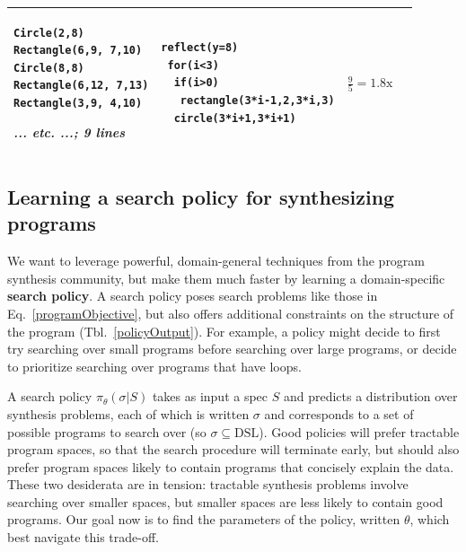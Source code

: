 \documentclass{article}
\theoremstyle{definition}
\begin{document}
\begin{table}[t]
\begin{tabular}{m{1.5cm}llc}
\begin{minipage}{\exampleTraceSize}\begin{lstlisting}
Circle(2,8)
Rectangle(6,9, 7,10)
Circle(8,8)
Rectangle(6,12, 7,13)
Rectangle(3,9, 4,10)
\end{lstlisting}\small\emph{... etc. ...; 9 lines}
  \end{minipage}&\begin{minipage}{\exampleProgramSize}
\begin{lstlisting}
reflect(y=8)
 for(i<3)
  if(i>0)
   rectangle(3*i-1,2,3*i,3)
  circle(3*i+1,3*i+1)
\end{lstlisting}
\end{minipage}&$\frac{9}{5} = 1.8\text{x}$ \\\bottomrule
  \end{tabular}
  \end{table}

\subsection{Learning a search policy for synthesizing programs}\label{learningASearchPolicy}

We want to leverage powerful, domain-general techniques from the program synthesis community,
but make them much faster by
learning a domain-specific \textbf{search policy}.
A search policy poses search problems
like those in Eq.~\ref{programObjective},
but also offers additional constraints on the structure of the program (Tbl.~\ref{policyOutput}).
For example, a policy might decide to first try searching over small programs before searching over large programs,
or decide to prioritize searching over programs that have loops.

A search policy $\pi_\theta(\sigma  | S )$ takes as input a spec $S$ and predicts a distribution over synthesis problems, each of which is written $\sigma $ and corresponds to a set of possible programs to search over (so $\sigma \subseteq \text{DSL}$).
Good policies will prefer tractable program spaces,
so that the search procedure will terminate early, 
but should also prefer program spaces likely to contain
programs that concisely explain the data.
These two desiderata are in tension:
tractable synthesis problems involve searching over smaller spaces,
but smaller spaces are less likely to contain good programs.
Our goal now is to find the parameters of the policy, written $\theta$, which best navigate this trade-off.
\end{document}
